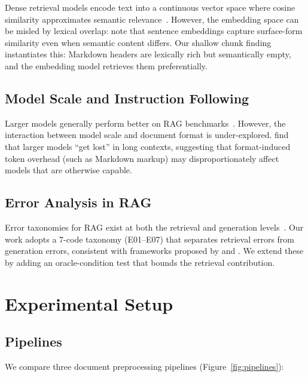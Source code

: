 \documentclass{article}
\begin{document}
Dense retrieval models encode text into a continuous vector space where cosine similarity approximates semantic relevance~\citep{karpukhin2020dense}. However, the embedding space can be misled by lexical overlap: \citet{reimers2019sentence} note that sentence embeddings capture surface-form similarity even when semantic content differs. Our shallow chunk finding instantiates this: Markdown headers are lexically rich but semantically empty, and the embedding model retrieves them preferentially.

\subsection{Model Scale and Instruction Following}

Larger models generally perform better on RAG benchmarks~\citep{lewis2020retrieval,izacard2022atlas}. However, the interaction between model scale and document format is under-explored. \citet{liu2024lost} find that larger models ``get lost'' in long contexts, suggesting that format-induced token overhead (such as Markdown markup) may disproportionately affect models that are otherwise capable.

\subsection{Error Analysis in RAG}

Error taxonomies for RAG exist at both the retrieval and generation levels~\citep{barnett2024seven,es2023ragas}. Our work adopts a 7-code taxonomy (E01--E07) that separates retrieval errors from generation errors, consistent with frameworks proposed by \citet{saad-falcon2023aragog} and \citet{yang2024crag}. We extend these by adding an oracle-condition test that bounds the retrieval contribution.

\section{Experimental Setup}

\subsection{Pipelines}

We compare three document preprocessing pipelines (Figure~\ref{fig:pipelines}):
\end{document}
